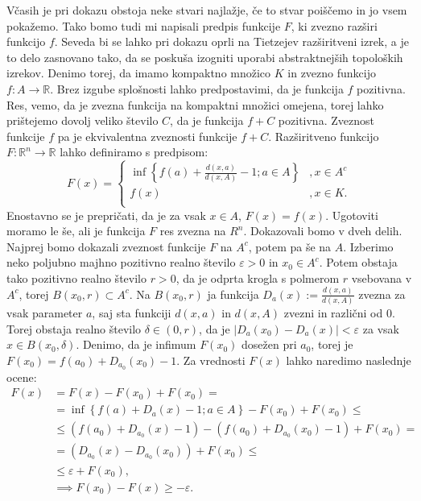 \documentclass[mat1]{fmfdelo}
\newcommand{\R}{\mathbb R}
\newcommand{\0}{\underline{0}}
\begin{document}
\begin{dokaz}
Včasih je pri dokazu obstoja neke stvari najlažje, če to stvar poiščemo in jo vsem pokažemo. Tako bomo tudi mi napisali predpis funkcije $F$, ki zvezno razširi funkcijo $f$. Seveda bi se lahko pri dokazu oprli na Tietzejev razširitveni izrek, a je to delo zasnovano tako, da se poskuša izogniti uporabi abstraktnejših topoloških izrekov. Denimo torej, da imamo kompaktno množico $K$ in zvezno funkcijo \mbox{$f : A \to \R$}. Brez izgube splošnosti lahko predpostavimi, da je funkcija $f$ pozitivna. Res, vemo, da je zvezna funkcija na kompaktni množici omejena, torej lahko prištejemo dovolj veliko število $C$, da je funkcija $f + C$ pozitivna. Zveznost funkcije $f$ pa je ekvivalentna zveznosti funkcije $f + C$.
Razširitveno funkcijo \mbox{$F : \R^n \to \R$} lahko definiramo s predpisom:
\[  F(x) = \left \{
\begin{array}{ll}
	\inf \left \{ f(a) + \frac{d(x, a)}{d(x, A)} - 1; a \in A \right \} &, x \in A^c \\
	f(x) &, x \in K. \\
\end{array} 
\right. \]
Enostavno se je prepričati, da je za vsak $x \in A$, $F(x) = f(x)$. Ugotoviti moramo le še, ali je funkcija $F$ res zvezna na $R^n$.
Dokazovali bomo v dveh delih. Najprej bomo dokazali zveznost funkcije $F$ na $A^c$, potem pa še na $A$.
Izberimo neko poljubno majhno pozitivno realno število $\varepsilon > 0$ in $x_0 \in A^c$. Potem obstaja tako pozitivno realno število $r>0$, da je odprta krogla s polmerom $r$ vsebovana v $A^c$, torej $B(x_0, r) \subset A^c$. Na $B(x_0, r)$ ja funkcija $D_a(x) := \frac{d(x, a)}{d(x, A)}$ zvezna za vsak parameter $a$, saj sta funkciji $d(x, a)$ in $d(x, A)$ zvezni in različni od $0$. Torej obstaja realno število $\delta \in (0, r)$, da je $|D_a(x_0) - D_a(x)| < \varepsilon$ za vsak $x \in B(x_0, \delta)$.
Denimo, da je infimum $F(x_0)$ dosežen pri $a_0$, torej je $F(x_0) = f(a_0) + D_{a_0}(x_0) - 1$. Za vrednosti $F(x)$ lahko naredimo naslednje ocene:
\begin{equation*} \label{eq1}
\begin{split}
F(x) & = F(x) - F(x_0) + F(x_0) = \\
& = \inf \left \{ f(a) + D_a(x) - 1; a \in A \right \} - F(x_0) + F(x_0) \leq \\
& \leq (f(a_0) + D_{a_0}(x) - 1) -  (f(a_0) + D_{a_0}(x_0) - 1) + F(x_0) = \\
& = (D_{a_0}(x) -  D_{a_0}(x_0)) + F(x_0) \leq \\
& \leq \varepsilon + F(x_0), \\
& \implies F(x_0) - F(x) \geq -\varepsilon.
\end{split}
\end{equation*}


\end{dokaz}
\end{document}
